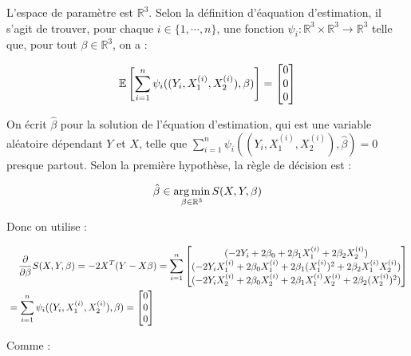 \documentclass[../main.tex]{subfiles}
\begin{document}
\begin{CJK*}{UTF8}{gbsn}
L'espace de paramètre est $\mathbb{R}^3$.
Selon la définition d'éaquation d'estimation, il s'agit de trouver, pour chaque $i \in \{1, \cdots, n\}$,
une fonction $\psi_i : \mathbb{R}^3 \times \mathbb{R}^3 \to \mathbb{R}^3$ telle que, pour 
tout $\beta \in \mathbb{R}^3$, on a :

\begin{equation*}
    \mathbb{E} \squared{ \sum_{i=1}^n \psi_i((Y_i, X^{(i)}_1, X^{(i)}_2), \beta)} = 
    \begin{bmatrix}
        0 \\
        0 \\
        0 
    \end{bmatrix}
\end{equation*}

On écrit $\hat{\beta}$ pour la solution de l'équation d'estimation, 
qui est une variable aléatoire dépendant $Y$ et $X$, telle que 
$\sum_{i=1}^n \psi_i((Y_i, X^{(i)}_1, X^{(i)}_2), \hat{\beta}) = 0$ presque partout.
Selon la première hypothèse, la règle de décision est :

\begin{equation*}
    \hat{\beta} \in \argmin_{\beta \in \mathbb{R}^3} S(X,Y,\beta)
\end{equation*}

Donc on utilise :

\begin{equation*}
    \begin{split}
    &\tab[0.4cm] \frac{\partial}{\partial \beta }S(X,Y,\beta) = -2X^T(Y-X\beta) = 
    \sum_{i=1}^n
    \begin{bmatrix}
        (-2Y_i + 2\beta_0 + 2\beta_1 X^{(i)}_1 + 2\beta_2 X^{(i)}_2) \\
        (-2Y_i X^{(i)}_1 + 2\beta_0 X^{(i)}_1 + 2\beta_1 (X^{(i)}_1)^2 + 2\beta_2 X^{(i)}_1 X^{(i)}_2) \\
        (-2Y_i X^{(i)}_2 + 2\beta_0 X^{(i)}_2 + 2\beta_1 X^{(i)}_1 X^{(i)}_2 + 2\beta_2 (X^{(i)}_2)^2)
    \end{bmatrix} \\ & =
    \sum_{i=1}^n \psi_i((Y_i, X^{(i)}_1, X^{(i)}_2), \beta) =
    \begin{bmatrix}
        0 \\
        0 \\
        0
    \end{bmatrix}
    \end{split}
\end{equation*}

Comme :


\end{CJK*}
\end{document}
